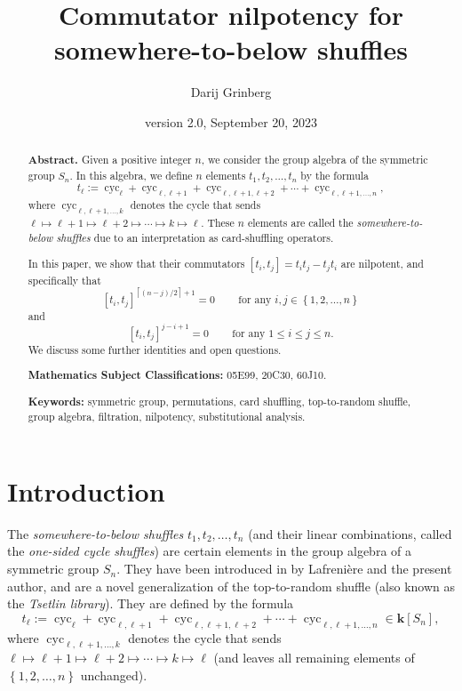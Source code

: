 \documentclass[numbers=enddot,12pt,final,onecolumn,notitlepage]{scrartcl}%
\theoremstyle{definition}
\begin{document}
\title{Commutator nilpotency for somewhere-to-below shuffles}
\author{Darij Grinberg}
\date{version 2.0,
September 20, 2023
}
\maketitle

\begin{abstract}
\textbf{Abstract.} Given a positive integer $n$, we consider the group algebra
of the symmetric group $S_{n}$. In this algebra, we define $n$ elements
$t_{1},t_{2},\ldots,t_{n}$ by the formula%
\[
t_{\ell}:=\operatorname*{cyc}\nolimits_{\ell}+\operatorname*{cyc}%
\nolimits_{\ell,\ell+1}+\operatorname*{cyc}\nolimits_{\ell,\ell+1,\ell
+2}+\cdots+\operatorname*{cyc}\nolimits_{\ell,\ell+1,\ldots,n},
\]
where \medskip$\operatorname*{cyc}\nolimits_{\ell,\ell+1,\ldots,k}$ denotes
the cycle that sends $\ell\mapsto\ell+1\mapsto\ell+2\mapsto\cdots\mapsto
k\mapsto\ell$. These $n$ elements are called the \emph{somewhere-to-below
shuffles} due to an interpretation as card-shuffling operators.

In this paper, we show that their commutators $\left[  t_{i},t_{j}\right]
=t_{i}t_{j}-t_{j}t_{i}$ are nilpotent, and specifically that
\[
\left[  t_{i},t_{j}\right]  ^{\left\lceil \left(  n-j\right)  /2\right\rceil
+1}=0\ \ \ \ \ \ \ \ \ \ \text{for any }i,j\in\left\{  1,2,\ldots,n\right\}
\]
and%
\[
\left[  t_{i},t_{j}\right]  ^{j-i+1}=0\ \ \ \ \ \ \ \ \ \ \text{for any }1\leq
i\leq j\leq n.
\]
We discuss some further identities and open questions. \medskip

\textbf{Mathematics Subject Classifications:} 05E99, 20C30, 60J10. \medskip

\textbf{Keywords:} symmetric group, permutations, card shuffling,
top-to-random shuffle, group algebra, filtration, nilpotency, substitutional analysis.

\end{abstract}
\tableofcontents

\section{Introduction}

The \emph{somewhere-to-below shuffles} $t_{1},t_{2},\ldots,t_{n}$ (and their
linear combinations, called the \emph{one-sided cycle shuffles}) are certain
elements in the group algebra of a symmetric group $S_{n}$. They have been
introduced in \cite{s2b1} by Lafreni\`{e}re and the present author, and are a
novel generalization of the top-to-random shuffle (also known as the
\emph{Tsetlin library}). They are defined by the formula%
\[
t_{\ell}:=\operatorname*{cyc}\nolimits_{\ell}+\operatorname*{cyc}%
\nolimits_{\ell,\ell+1}+\operatorname*{cyc}\nolimits_{\ell,\ell+1,\ell
+2}+\cdots+\operatorname*{cyc}\nolimits_{\ell,\ell+1,\ldots,n}\in
\mathbf{k}\left[  S_{n}\right]  ,
\]
where $\operatorname*{cyc}\nolimits_{\ell,\ell+1,\ldots,k}$ denotes the cycle
that sends $\ell\mapsto\ell+1\mapsto\ell+2\mapsto\cdots\mapsto k\mapsto\ell$
(and leaves all remaining elements of $\left\{  1,2,\ldots,n\right\}  $ unchanged).
\end{document}
